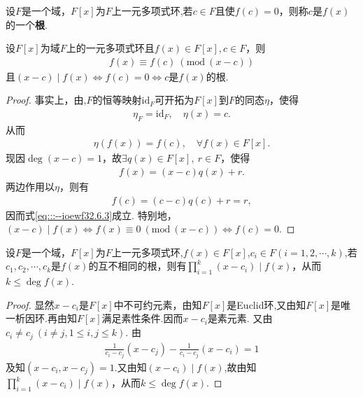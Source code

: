 \documentclass[../../main.tex]{subfiles}%
\begin{document}
\begin{definition}
设$F$是一个域，$F[x]$为$F$上一元多项式环,若$c \in F$且使$f(c) = 0$，则称$c$是$f(x)$的一个\textbf{根}.
\end{definition}

\begin{corollary}\label{corollary:抽象代数--推论2.6.2}
设$F[x]$为域$F$上的一元多项式环且$f(x) \in F[x],c \in F$，则
\begin{align}\label{eq:::--ioewf32.6.3}
f(x) \equiv f(c)\ (\mathrm{mod}\ (x - c))
\end{align}
且$(x - c) \mid f(x)\iff f(c) = 0\iff c\text{是}f(x)\text{的根}$.
\end{corollary}
\begin{proof}
事实上，由,$F$的恒等映射$\mathrm{id}_F$可开拓为$F[x]$到$F$的同态$\eta$，使得
\begin{align*}
\eta _F=\mathrm{id}_F,\quad \eta \left( x \right) =c.
\end{align*}
从而
\begin{align*}
\eta(f(x)) = f(c),\quad \forall f(x) \in F[x].
\end{align*}
现因$\deg(x - c) = 1$，故$\exists q(x) \in F[x],\ r \in F$，使得
\begin{align*}
f(x) = (x - c)q(x) + r.
\end{align*}
两边作用以$\eta$，则有
\begin{align*}
f(c) = (c - c)q(c) + r = r,
\end{align*}
因而式\eqref{eq:::--ioewf32.6.3}成立.
特别地，$(x - c) \mid f(x)\iff f(x) \equiv 0\ (\mathrm{mod}\ (x - c))\iff f(c) = 0$.
\end{proof}

\begin{corollary}\label{corollary:抽象代数--推论2.6.3}
设$F$是一个域，$F[x]$为$F$上一元多项式环,$f(x) \in F[x]$,$c_i \in F(i=1,2,\cdots,k)$,若$c_1, c_2, \cdots, c_k$是$f(x)$的互不相同的根，则有$\prod\limits_{i=1}^k (x - c_i) \mid f(x)$，从而$k \leqslant \deg f(x)$.
\end{corollary}
\begin{proof}
显然$x - c_i$是$F[x]$中不可约元素，由知$F[x]$是Euclid环,又由知$F[x]$是唯一析因环.再由知$F[x]$满足素性条件.因而$x - c_i$是素元素. 又由$c_i \neq c_j\ (i \neq j, 1 \leqslant i, j \leqslant k)$. 由
\begin{align*}
\frac{1}{c_i - c_j}(x - c_j) - \frac{1}{c_i - c_j}(x - c_i) = 1
\end{align*}
及知$(x - c_i, x - c_j) = 1$.又由知$(x-c_i)\mid f(x)$,故由知$\prod\limits_{i=1}^k (x - c_i) \mid f(x)$，从而$k \leqslant \deg f(x)$.
\end{proof}
\end{document}
